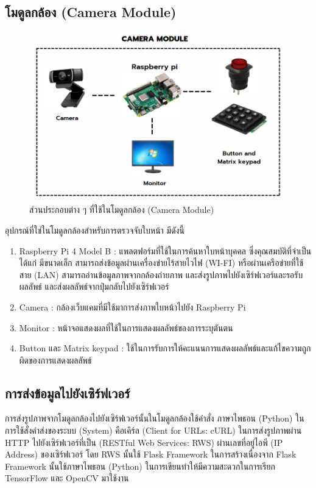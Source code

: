 \subsection{โมดูลกล้อง (Camera Module)}

\begin{figure}[ht!]
  \begin{center}
    \includegraphics[scale=.45]{pic/camera_module.png}
    \caption[ส่วนประกอบต่าง ๆ ที่ใช้ในโมดูลกล้อง (Camera Module)]{ส่วนประกอบต่าง ๆ ที่ใช้ในโมดูลกล้อง (Camera Module)}
    \label{fig:camera}
  \end{center}
\end{figure}
\newpage
อุปกรณ์ที่ใช่ในโมดูลกล้องสำหรับการตรวจจับใบหน้า มีดังนี้
\begin{enumerate}
  \item Raspberry Pi 4 Model B : แพลตฟอร์มที่ใช้ในการค้นหาใบหน้าบุคคล ซึ่งคุณสมบัติที่จำเป็นได้แก่ 
  มีขนาดเล็ก สามารถส่งข้อมูลผ่านเครื่องข่ายไร้สายไวไฟ (WI-FI) หรือผ่านเครือข่ายที่ใช้สาย (LAN) สามารถอ่านข้อมูลภาพจากกล้องถ่ายภาพ 
  และส่งรูปภาพไปยังเซิร์ฟเวอร์และรอรับผลลัพธ์ และส่งผลลัพธ์จากปุ่มกลับไปยังเซิร์ฟเวอร์
  \item Camera : กล้องเว็บแคมที่มีใช้มาการส่งภาพใบหน้าไปยัง Raspberry Pi
  \item Monitor : หน้าจอแสดงผลที่ใช้ในการแสดงผลลัพธ์ของการระบุตันตน
  \item Button และ Matrix keypad : ใช้ในการรับการให้คะแนนการแสดงผลลัพธ์และแก้ไขความถูกผิดของการแสดงผลลัพธ์
\end{enumerate}

\subsection{การส่งข้อมูลไปยังเซิร์ฟเวอร์}
การส่งรูปภาพจากโมดูลกล้องไปยังเซิร์ฟเวอร์นั้นในโมดูลกล้องใช้คำสั่ง ภาษาไพธอน (Python) ในการใช้สั่งคำส่งของระบบ (System)
คือเคิร์ล  (Client for URLs: cURL) ในการส่งรูปภาพผ่าน HTTP ไปยังเซิร์ฟเวอร์ที่เป็น (RESTful Web Services: RWS)
ผ่านเลขที่อยู่ไอพี (IP Address) ของเซิร์ฟเวอร์ โดย RWS นั้นใช้ Flask Framework 
ในการสร้างเนื่องจาก Flask Framework นั้นใช้ภาษาไพธอน (Python) ในการเขียนทำให้มีความสะดวกในการเรียก TensorFlow และ OpenCV มาใช้งาน

